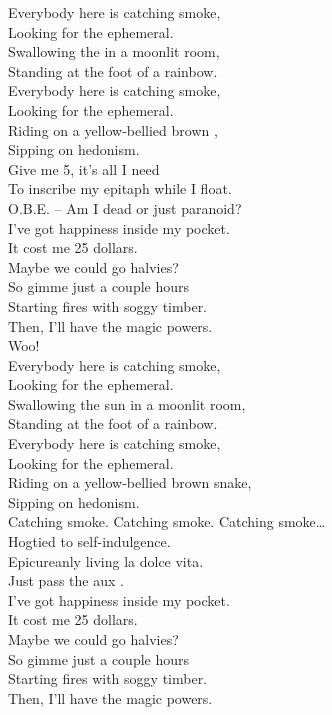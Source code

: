 Everybody here is catching smoke, \\
Looking for the ephemeral. \\
Swallowing the  in a moonlit room, \\
Standing at the foot of a rainbow. \\
Everybody here is catching smoke, \\
Looking for the ephemeral. \\
Riding on a yellow-bellied brown , \\
Sipping on hedonism. \\

Give me 5, it's all I need \\
To inscribe my epitaph while I float. \\ 
O.B.E. -- Am I dead or just paranoid? \\

I've got happiness inside my pocket. \\
It cost me 25 dollars. \\
Maybe we could go halvies? \\
So gimme just a couple hours \\
Starting fires with soggy timber. \\
Then, I'll have the magic powers. \\
Woo! \\

Everybody here is catching smoke, \\
Looking for the ephemeral. \\
Swallowing the sun in a moonlit room, \\
Standing at the foot of a rainbow. \\
Everybody here is catching smoke, \\
Looking for the ephemeral. \\
Riding on a yellow-bellied brown snake, \\
Sipping on hedonism. \\

Catching smoke. Catching smoke. Catching smoke… \\

Hogtied to self-indulgence. \\
Epicureanly living la dolce vita. \\
Just pass the aux . \\

I've got happiness inside my pocket. \\
It cost me 25 dollars. \\
Maybe we could go halvies? \\
So gimme just a couple hours \\
Starting fires with soggy timber. \\
Then, I'll have the magic powers. \\

